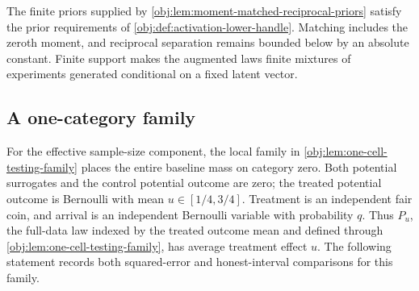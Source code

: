 \documentclass[11pt]{article}
\begin{document}
The finite priors  supplied by \cref{obj:lem:moment-matched-reciprocal-priors} satisfy the prior requirements of \cref{obj:def:activation-lower-handle}. Matching includes the zeroth moment, and reciprocal separation remains bounded below by an absolute constant. Finite support makes the augmented laws finite mixtures of experiments generated conditional on a fixed latent vector.

\subsection{A one-category family}

For the effective sample-size component, the local family in \cref{obj:lem:one-cell-testing-family} places the entire baseline mass on category zero. Both potential surrogates and the control potential outcome are zero; the treated potential outcome is Bernoulli with mean \(u\in[1/4,3/4]\). Treatment is an independent fair coin, and arrival is an independent Bernoulli variable with probability \(q\). Thus \(P_u\), the full-data law indexed by the treated outcome mean and defined through \cref{obj:lem:one-cell-testing-family}, has average treatment effect \(u\). The following statement records both squared-error and honest-interval comparisons for this family.
\end{document}
